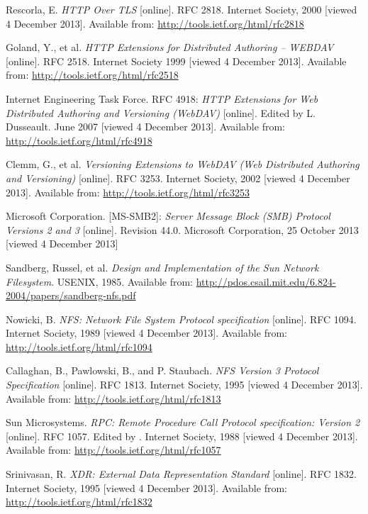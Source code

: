 \begin{thebibliography}{99}
	{\sc Rescorla,} E.
	\emph{HTTP Over TLS}
	[online].
	RFC 2818.
	Internet Society, 2000 [viewed 4 December 2013].
	Available from: \newline \url{http://tools.ietf.org/html/rfc2818}

	{\sc Goland,} Y., et al.
	\emph{HTTP Extensions for Distributed Authoring -- WEBDAV}
	[online].
	RFC 2518.
	Internet Society 1999 [viewed 4 December 2013].
	Available from: \url{http://tools.ietf.org/html/rfc2518}

	{\sc Internet Engineering Task Force}.
	RFC 4918:
	\emph{HTTP Extensions for Web Distributed Authoring and Versioning (WebDAV)}
	[online].
	Edited by L. Dusseault.
	June 2007 [viewed 4 December 2013].
	Available from: \url{http://tools.ietf.org/html/rfc4918}

	{\sc Clemm,} G., et al.
	\emph{Versioning Extensions to WebDAV (Web Distributed Authoring and Versioning)}
	[online].
	RFC 3253.
	Internet Society, 2002 [viewed 4 December 2013].
	Available from: \url{http://tools.ietf.org/html/rfc3253}

	{\sc Microsoft Corporation}.
	[MS-SMB2]:
	\emph{Server Message Block (SMB) Protocol Versions 2 and 3}
	[online].
	Revision 44.0.
	Microsoft Corporation, 25 October 2013 [viewed 4 December 2013]

	{\sc Sandberg,} Russel, et al.
	\emph {Design and Implementation of the Sun Network Filesystem}.
	USENIX, 1985.
	Available from: \newline \url{http://pdos.csail.mit.edu/6.824-2004/papers/sandberg-nfs.pdf}

	{\sc Nowicki,} B.
	\emph{NFS: Network File System Protocol specification}
	[online].
	RFC 1094.
	Internet Society, 1989 [viewed 4 December 2013].
	Available from: \url{http://tools.ietf.org/html/rfc1094}

	{\sc Callaghan,} B., {\sc Pawlowski,} B., and P. {\sc Staubach}.
	\emph{NFS Version 3 Protocol Specification}
	[online].
	RFC 1813.
	Internet Society, 1995 [viewed 4 December 2013].
	Available from: \url{http://tools.ietf.org/html/rfc1813}

	{\sc Sun Microsystems}.
	\emph{RPC: Remote Procedure Call Protocol specification: Version 2}
	[online].
	RFC 1057.
	Edited by .
	Internet Society, 1988 [viewed 4 December 2013].
	Available from: \url{http://tools.ietf.org/html/rfc1057}

	{\sc Srinivasan,} R.
	\emph{XDR: External Data Representation Standard}
	[online].
	RFC 1832.
	Internet Society, 1995 [viewed 4 December 2013].
	Available from: \url{http://tools.ietf.org/html/rfc1832}


\end{thebibliography}
